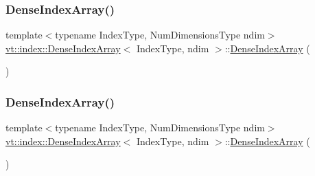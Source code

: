 \mbox{\label{structvt_1_1index_1_1_dense_index_array_a835d59e4ac4c01436b7068c2fa05137b}} 
\subsubsection{\texorpdfstring{Dense\+Index\+Array()}{DenseIndexArray()}\hspace{0.1cm}{\footnotesize\ttfamily [2/6]}}
{\footnotesize\ttfamily template$<$typename Index\+Type, Num\+Dimensions\+Type ndim$>$ \\
\hyperlink{structvt_1_1index_1_1_dense_index_array}{vt\+::index\+::\+Dense\+Index\+Array}$<$ Index\+Type, ndim $>$\+::\hyperlink{structvt_1_1index_1_1_dense_index_array}{Dense\+Index\+Array} (\begin{DoxyParamCaption}\item[{\hyperlink{structvt_1_1index_1_1_dense_index_array}{Dense\+Index\+Array}$<$ Index\+Type, ndim $>$ const \&}]{ }\end{DoxyParamCaption})\hspace{0.3cm}{\ttfamily [default]}}

\mbox{\label{structvt_1_1index_1_1_dense_index_array_a2a9e543ccf3fa97a217ad1c981911634}} 
\subsubsection{\texorpdfstring{Dense\+Index\+Array()}{DenseIndexArray()}\hspace{0.1cm}{\footnotesize\ttfamily [3/6]}}
{\footnotesize\ttfamily template$<$typename Index\+Type, Num\+Dimensions\+Type ndim$>$ \\
\hyperlink{structvt_1_1index_1_1_dense_index_array}{vt\+::index\+::\+Dense\+Index\+Array}$<$ Index\+Type, ndim $>$\+::\hyperlink{structvt_1_1index_1_1_dense_index_array}{Dense\+Index\+Array} (\begin{DoxyParamCaption}\item[{\hyperlink{structvt_1_1index_1_1_dense_index_array}{Dense\+Index\+Array}$<$ Index\+Type, ndim $>$ \&\&}]{ }\end{DoxyParamCaption})\hspace{0.3cm}{\ttfamily [default]}}

